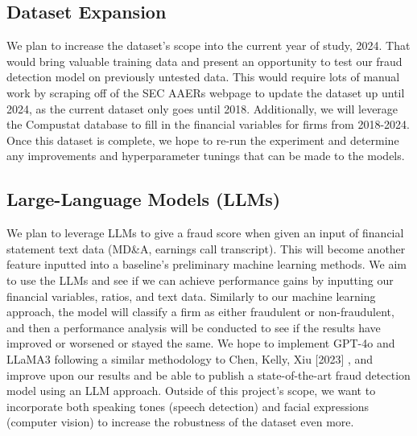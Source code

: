 \documentclass[conference]{IEEEtran}
\begin{document}
\subsection{Dataset Expansion}
We plan to increase the dataset's scope into the current year of study, 2024. That would bring valuable training data and present an opportunity to test our fraud detection model on previously untested data. This would require lots of manual work by scraping off of the SEC AAERs webpage to update the dataset up until 2024, as the current dataset only goes until 2018. Additionally, we will leverage the Compustat database to fill in the financial variables for firms from 2018-2024. Once this dataset is complete, we hope to re-run the experiment and determine any improvements and hyperparameter tunings that can be made to the models. 

\subsection{Large-Language Models (LLMs)}
We plan to leverage LLMs to give a fraud score when given an input of financial statement text data (MD\&A, earnings call transcript). This will become another feature inputted into a baseline's preliminary machine learning methods. We aim to use the LLMs and see if we can achieve performance gains by inputting our financial variables, ratios, and text data. Similarly to our machine learning approach, the model will classify a firm as either fraudulent or non-fraudulent, and then a performance analysis will be conducted to see if the results have improved or worsened or stayed the same. We hope to implement GPT-4o and LLaMA3 following a similar methodology to Chen, Kelly, Xiu [2023] \cite{b2}, and improve upon our results and be able to publish a state-of-the-art fraud detection model using an LLM approach. Outside of this project's scope, we want to incorporate both speaking tones (speech detection) and facial expressions (computer vision) to increase the robustness of the dataset even more. 
\end{document}
